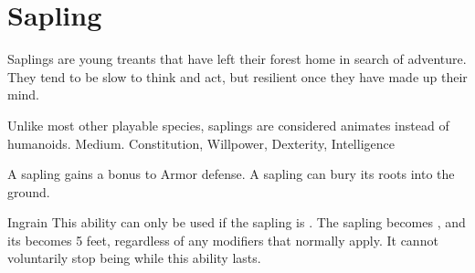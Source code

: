 

\section{Sapling}\label{Sapling}

  Saplings are young treants that have left their forest home in search of adventure.
  They tend to be slow to think and act, but resilient once they have made up their mind.

   Unlike most other playable species, saplings are considered animates instead of humanoids.
   Medium.
    Constitution,  Willpower,  Dexterity,  Intelligence
  \begin{raggeditemize}
     A sapling gains a  bonus to Armor defense.
     A sapling can bury its roots into the ground.
    \begin{activeability}{Ingrain}{}
        \rankline
        This ability can only be used if the sapling is .
        The sapling becomes \braced, and its  becomes 5 feet, regardless of any modifiers that normally apply.
        It cannot voluntarily stop being  while this ability lasts.


\end{activeability}
\end{raggeditemize}
